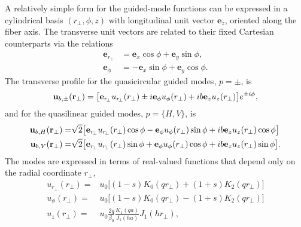 A relatively simple form for the guided-mode functions can be expressed in a cylindrical basis $(r_\perp, \phi, z)$ with longitudinal unit vector $\mathbf{e}_z$, oriented along the fiber axis.  
The transverse unit vectors are related to their fixed Cartesian counterparts via the relations
\begin{subequations}
	\begin{align}
		\mathbf{e}_{r_{\!\perp}}     &= \mathbf{e}_x \cos \phi + \mathbf{e}_y \sin \phi, \\
		\mathbf{e}_\phi &= - \mathbf{e}_x \sin \phi + \mathbf{e}_y \cos \phi.
	\end{align}
\end{subequations}
The transverse profile for the quasicircular guided modes, $p = \pm$, is
	\begin{align} \label{Eq::QuasicircularModes}
		\mbf{u}_{b,\pm}(\mathbf{r}_\perp) = \big[\mathbf{e}_{r_{\!\perp}} u_{r_{\!\perp}}(r_\perp) \pm i \mathbf{e}_\phi u_\phi(r_\perp) +  i b \mathbf{e}_z  u_z(r_\perp) \big]e^{ \pm i \phi}, 
	\end{align}
and for the quasilinear guided modes, $p = \{H,V\}$, is
	\begin{subequations} \label{Eq::QuasilinearModes}
	\begin{align}
		\mathbf{u}_{b,H}(\mathbf{r}_\perp) = & \sqrt{2} \big[ \mathbf{e}_{r_{\!\perp}} u_{r_{\!\perp}}(r_\perp) \cos \phi - \mathbf{e}_\phi u_\phi(r_\perp) \sin \phi +  ib \mathbf{e}_z  u_z(r_\perp) \cos \phi \big] \\
		\mathbf{u}_{b,V}(\mathbf{r}_\perp) = & \sqrt{2} \big[ \mathbf{e}_{r_{\!\perp}} u_{r_{\!\perp}}(r_\perp) \sin \phi + \mathbf{e}_\phi u_\phi(r_\perp) \cos \phi +  ib \mathbf{e}_z  u_z(r_\perp) \sin \phi \big]. 
	\end{align}
	\end{subequations}
The modes are expressed in terms of real-valued functions that depend only on the radial coordinate $r_\perp$,
	\begin{subequations} \label{Eq::ProfileFunctions}
	\begin{align} 
		u_{r_{\!\perp}}(r_\perp) =& u_0 \big[ (1-s) K_0(q{r_{\!\perp}}) + (1+s)K_2(q{r_{\!\perp}})\big] \\
		u_\phi(r_\perp) =& u_0\big[ (1-s) K_0(q{r_{\!\perp}}) - (1+s)K_2(q{r_{\!\perp}})\big] \\
		u_z(r_\perp) =& u_0 \frac{2 q}{\beta_0} \frac{K_1(qa)}{J_1(ha)} J_1(h{r_{\!\perp}}), \label{Eq::zprofile}
	\end{align}
	\end{subequations}
